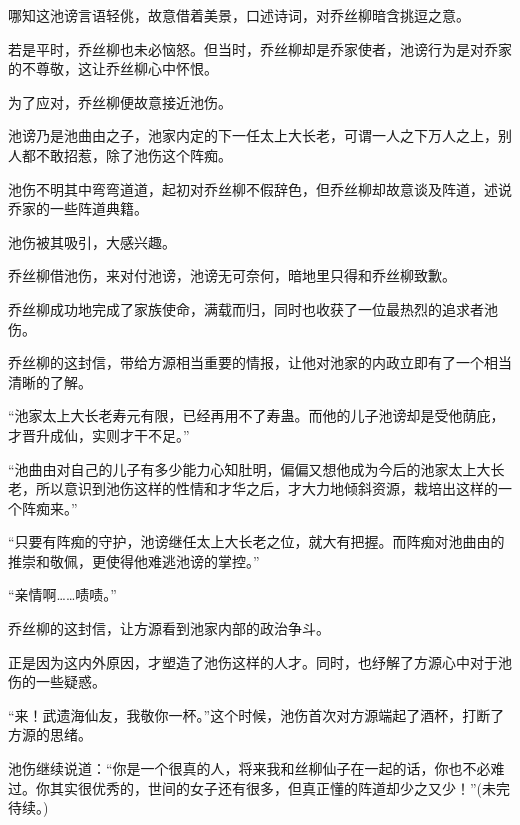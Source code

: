 \begin{this_body}
哪知这池谤言语轻佻，故意借着美景，口述诗词，对乔丝柳暗含挑逗之意。

若是平时，乔丝柳也未必恼怒。但当时，乔丝柳却是乔家使者，池谤行为是对乔家的不尊敬，这让乔丝柳心中怀恨。

为了应对，乔丝柳便故意接近池伤。

池谤乃是池曲由之子，池家内定的下一任太上大长老，可谓一人之下万人之上，别人都不敢招惹，除了池伤这个阵痴。

池伤不明其中弯弯道道，起初对乔丝柳不假辞色，但乔丝柳却故意谈及阵道，述说乔家的一些阵道典籍。

池伤被其吸引，大感兴趣。

乔丝柳借池伤，来对付池谤，池谤无可奈何，暗地里只得和乔丝柳致歉。

乔丝柳成功地完成了家族使命，满载而归，同时也收获了一位最热烈的追求者池伤。

乔丝柳的这封信，带给方源相当重要的情报，让他对池家的内政立即有了一个相当清晰的了解。

“池家太上大长老寿元有限，已经再用不了寿蛊。而他的儿子池谤却是受他荫庇，才晋升成仙，实则才干不足。”

“池曲由对自己的儿子有多少能力心知肚明，偏偏又想他成为今后的池家太上大长老，所以意识到池伤这样的性情和才华之后，才大力地倾斜资源，栽培出这样的一个阵痴来。”

“只要有阵痴的守护，池谤继任太上大长老之位，就大有把握。而阵痴对池曲由的推崇和敬佩，更使得他难逃池谤的掌控。”

“亲情啊……啧啧。”

乔丝柳的这封信，让方源看到池家内部的政治争斗。

正是因为这内外原因，才塑造了池伤这样的人才。同时，也纾解了方源心中对于池伤的一些疑惑。

“来！武遗海仙友，我敬你一杯。”这个时候，池伤首次对方源端起了酒杯，打断了方源的思绪。

池伤继续说道：“你是一个很真的人，将来我和丝柳仙子在一起的话，你也不必难过。你其实很优秀的，世间的女子还有很多，但真正懂的阵道却少之又少！”(未完待续。)

\end{this_body}


